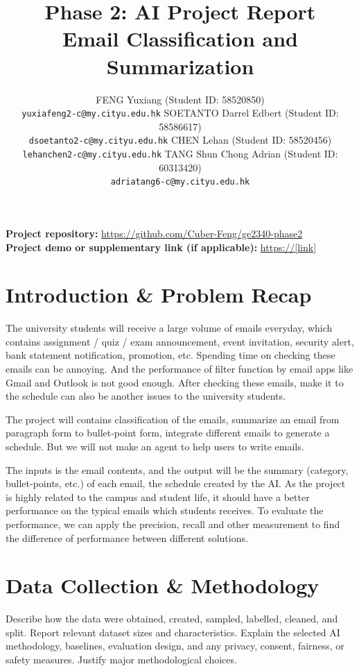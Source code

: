 \documentclass{article}
\title{Phase 2: AI Project Report\\
\large Email Classification and Summarization}
\author{
  FENG Yuxiang (Student ID: 58520850)\\
  \texttt{yuxiafeng2-c@my.cityu.edu.hk}
  \And 
  SOETANTO Darrel Edbert (Student ID: 58586617)\\
  \texttt{dsoetanto2-c@my.cityu.edu.hk}
  \AND
  CHEN Lehan (Student ID: 58520456)\\
  \texttt{lehanchen2-c@my.cityu.edu.hk}
  \And
  TANG Shun Chong Adrian (Student ID: 60313420)\\
  \texttt{adriatang6-c@my.cityu.edu.hk}
}
\begin{document}
\maketitle

\noindent\textbf{Project repository:} \url{https://github.com/Cuber-Feng/ge2340-phase2}\\
\textbf{Project demo or supplementary link (if applicable):} \url{https://[link]}


\section{Introduction \& Problem Recap}

The university students will receive a large volume of emails everyday, which contains assignment / quiz / exam announcement, event invitation, security alert, bank statement notification, promotion, etc. Spending time on checking these emails can be annoying. And the performance of filter function by email apps like Gmail and Outlook is not good enough. After checking these emails, make it to the schedule can also be another issues to the university students.

The project will contains classification of the emails, summarize an email from paragraph form to bullet-point form, integrate different emails to generate a schedule. But we will not make an agent to help users to write emails.

The inputs is the email contents, and the output will be the summary (category, bullet-points, etc.) of each email, the schedule created by the AI. As the project is highly related to the campus and student life, it should have a better performance on the typical emails which students receives. To evaluate the performance, we can apply the precision, recall and other measurement to find the difference of performance between different solutions.

\section{Data Collection \& Methodology}
Describe how the data were obtained, created, sampled, labelled, cleaned, and split. Report relevant dataset sizes and characteristics. Explain the selected AI methodology, baselines, evaluation design, and any privacy, consent, fairness, or safety measures. Justify major methodological choices.
\end{document}

